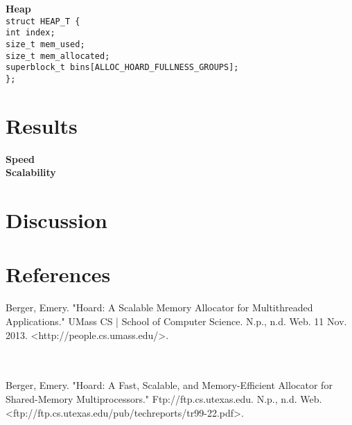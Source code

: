 \documentclass[11pt]{article}
\begin{document}
\noindent \textbf{Heap}
\\
\texttt{struct HEAP\_T \{
\\
\indent    int index;
\\
\indent    size\_t mem\_used;
\\
 \indent   size\_t mem\_allocated;
\\
 \indent   superblock\_t\* bins[ALLOC\_HOARD\_FULLNESS\_GROUPS];
\\
\};}


\section{Results}
\textbf{Speed}
\\
\textbf{Scalability}
\\
\section{Discussion}
 


\section{References}

Berger, Emery. "Hoard: A Scalable Memory Allocator for Multithreaded Applications." UMass CS | School of Computer Science. N.p., n.d. Web. 11 Nov. 2013. <http://people.cs.umass.edu/>.

\\
\\
Berger, Emery. "Hoard: A Fast, Scalable, and Memory-Efficient Allocator for Shared-Memory Multiprocessors." Ftp://ftp.cs.utexas.edu. N.p., n.d. Web. <ftp://ftp.cs.utexas.edu/pub/techreports/tr99-22.pdf>.

\end{document}
